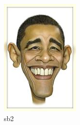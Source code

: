 \documentclass[12pt]{article}
\begin{document}
    \begin{figure}[htbp]
        \centering
        \hspace{20pt}%
        \begin{minipage}{149pt}
            \centering
            \includegraphics{obama.jpg}
            \caption{sb2}
        \end{minipage}
    \end{figure}
\end{document}
